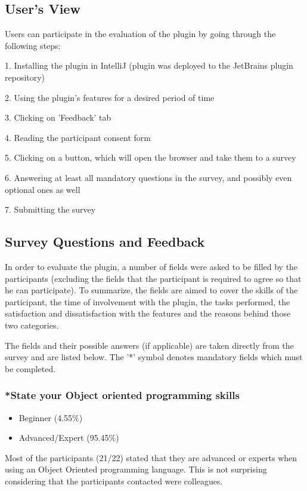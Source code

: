 \documentclass{l4proj}
\begin{document}
\subsection{User's View}
Users can participate in the evaluation of the plugin by going through the following steps:

1. Installing the plugin in IntelliJ (plugin was deployed to the JetBrains plugin repository)

2. Using the plugin's features for a desired period of time

3. Clicking on 'Feedback' tab

4. Reading the participant consent form

5. Clicking on a button, which will open the browser and take them to a survey

6. Answering at least all mandatory questions in the survey, and possibly even optional ones as well

7. Submitting the survey

\subsection{Survey Questions and Feedback}
In order to evaluate the plugin, a number of fields were asked to be filled by the participants (excluding the fields that the participant is required to agree so that he can participate). To summarize, the fields are aimed to cover the skills of the participant, the time of involvement with the plugin, the tasks performed, the satisfaction and dissatisfaction with the features and the reasons behind those two categories.

\noindent
The fields and their possible answers (if applicable) are taken directly from the survey and are listed below. The '*' symbol denotes mandatory fields which must be completed.

\subsubsection{*State your Object oriented programming skills}
\begin{itemize}
\item Beginner (4.55\%)
\item Advanced/Expert (95.45\%)
\end{itemize}

\noindent
Most of the participants (21/22) stated that they are advanced or experts when using an Object Oriented programming language. This is not surprising considering that the participants contacted were colleagues.
\end{document}
